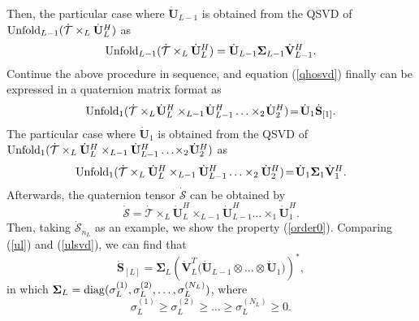 \documentclass[journal]{IEEEtran}
\begin{document}
Then, the particular case where $\dot{\mathbf{U}}_{L-1}$ is obtained from the QSVD of ${\rm{Unfold}}_{L-1}(\dot{\mathcal{T}}\times_{L}\dot{\mathbf{U}}_{L}^{H})$ as
\begin{equation}\label{ul-1svd}
{\rm{Unfold}}_{L-1}(\dot{\mathcal{T}}\times_{L}\dot{\mathbf{U}}_{L}^{H})=\dot{\mathbf{U}}_{L-1}\mathbf{\Sigma}_{L-1}\dot{\mathbf{V}}_{L-1}^{H}.
\end{equation} 
 Continue the above procedure in sequence, and equation (\ref{qhosvd}) finally can be expressed in a quaternion matrix format as 
\begin{equation}\label{u1}
\begin{split}
{\rm{Unfold}}_{1}(\dot{\mathcal{T}}\times_{L}\!\dot{\mathbf{U}}_{L}^{H}\times_{L-1}\!\dot{\mathbf{U}}_{L-1}^{H}\ldots\times_{2}\!\dot{\mathbf{U}}_{2}^{H})\!=\!\dot{\mathbf{U}}_{1}\dot{\mathbf{S}}_{[1]}.
\end{split}
\end{equation}
The particular case where $\dot{\mathbf{U}}_{1}$ is obtained from the QSVD of ${\rm{Unfold}}_{1}(\dot{\mathcal{T}}\times_{L}\dot{\mathbf{U}}_{L}^{H}\times_{L-1}\dot{\mathbf{U}}_{L-1}^{H}\ldots\!\times_{2}\!\dot{\mathbf{U}}_{2}^{H})$ as
\begin{equation}\label{u1svd}
{\rm{Unfold}}_{1}(\dot{\mathcal{T}}\times_{L}\dot{\mathbf{U}}_{L}^{H}\times_{L-1}\dot{\mathbf{U}}_{L-1}^{H}\ldots\times_{2}\dot{\mathbf{U}}_{2}^{H})\!=\!\dot{\mathbf{U}}_{1}\mathbf{\Sigma}_{1}\dot{\mathbf{V}}_{1}^{H}.
\end{equation}
Afterwards, the quaternion tensor $\dot{\mathcal{S}}$ can be obtained by 
\begin{equation}\label{s}
\dot{\mathcal{S}}=\dot{\mathcal{T}}\times_{L}\dot{\mathbf{U}}_{L}^{H}\times_{L-1}\dot{\mathbf{U}}_{L-1}^{H}\ldots\times_{1}\dot{\mathbf{U}}_{1}^{H}.
\end{equation}
Then, taking $\dot{\mathcal{S}}_{n_{L}}$ as an example, we show the property (\ref{order0}). Comparing (\ref{ul}) and (\ref{ulsvd}), we can find that 
\begin{equation}\label{sl}
\dot{\mathbf{S}}_{[L]}=\mathbf{\Sigma}_{L}\left(\dot{\mathbf{V}}_{L}^{T}\big(\dot{\mathbf{U}}_{L-1}\otimes\ldots\otimes\dot{\mathbf{U}}_{1}\big)\right)^{\ast},
\end{equation}
in which $\mathbf{\Sigma}_{L}={\rm{diag}}(\sigma_{L}^{(1)},\sigma_{L}^{(2)},\ldots,\sigma_{L}^{(N_{L})})$, where 
\begin{equation}\label{order}
\sigma_{L}^{(1)}\geq\sigma_{L}^{(2)}\geq\ldots\geq\sigma_{L}^{(N_{L})}\geq 0.
\end{equation}
\end{document}
